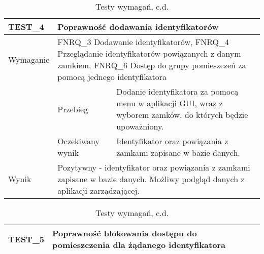         \pagebreak  

        \begin{table}[h!]
            \ContinuedFloat
            \caption{Testy wymagań, c.d.}
            \begin{subtable}[c]{\textwidth}
                \centering
                    \begin{tabular}{|p{2cm}|p{}|p{}|}
                    \hline
                    TEST\_4               & \multicolumn{2}{l|}{\textbf{Poprawność dodawania identyfikatorów}}                                                            \\ \hline
                    \cellcolor[gray]{0.8} Wymaganie             & \multicolumn{2}{p{12cm}|}{FNRQ\_3 Dodawanie identyfikatorów, FNRQ\_4 Przeglądanie identyfikatorów powiązanych z danym zamkiem, FNRQ\_6 Dostęp do grupy pomieszczeń za pomocą jednego identyfikatora }                                                                                    \\ \hline
                    \cellcolor[gray]{0.8} \multirow{2}{*}{Opis} & Przebieg           & Dodanie identyfikatora za pomocą menu w aplikacji GUI, wraz z wyborem zamków, do których będzie upoważniony.  \\ \cline{2-3} 
                    \cellcolor[gray]{0.8}                      & Oczekiwany wynik   & Identyfikator oraz powiązania z zamkami zapisane w bazie danych.                                                 \\ \hline
                    \cellcolor[gray]{0.8} Wynik                 & \multicolumn{2}{p{12cm}|}{Pozytywny - identyfikator oraz powiązania z zamkami zapisane w bazie danych. Możliwy podgląd danych z aplikacji zarządzającej.}                                                                                  \\ \hline
                    \end{tabular}%
                \label{tbl:test4}
                \vspace{10mm}           
            \end{subtable}
        \quad%
            \begin{subtable}[c]{\textwidth}
                \centering
                    \begin{tabular}{|p{2cm}|p{}|p{}|}
                    \hline
                    TEST\_5               & \multicolumn{2}{p{12cm}|}{\textbf{Poprawność blokowania dostępu do pomieszczenia dla żądanego identyfikatora}}                                                            \\ \hline

\end{tabular}
\end{subtable}
\end{table}
